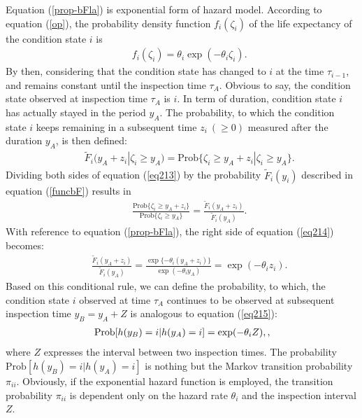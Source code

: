 Equation (\ref{prop-bFla}) is exponential form of hazard model. According to equation (\ref{op}), the probability density function $f_i(\zeta_i)$ of the life expectancy of the condition state $i$ is
\begin{eqnarray}
&& f_i(\zeta_i)=\theta_i \exp(-\theta_i \zeta_i).\label{kikan}
\end{eqnarray}
By then, considering that the condition state has changed to $i$ at the time  $\tau_{i-1}$, and remains constant until the inspection time $\tau_A$. Obvious to say, the condition state observed at inspection time $\tau_A$ is $i$. In term of duration, condition state $i$ has actually stayed in the period $y_A$. The probability, to which the condition state $i$ keeps remaining in a subsequent time $z_i~(\geq 0)$ measured after the duration $y_A$, is then defined:
\begin{eqnarray}
&& \tilde{F}_i(y_A+z_i|\zeta_i \geq y_A) 
 = \mbox{Prob} \{\zeta_i \geq y_A+z_i | \zeta_i \geq y_A\}. \label{eq213}
\end{eqnarray}
Dividing both sides of equation (\ref{eq213}) by the probability $\tilde{F}_i(y_i)$ described in equation (\ref{funcbF}) results in
\begin{eqnarray}
&& \frac{\mbox{Prob} \{\zeta_i \geq y_A+z_i\}}{ \mbox{Prob}\{\zeta_i \geq y_A\}} = \frac{\tilde{F}_i(y_A+z_i)}{\tilde{F}_i(y_A)}. \label{eq214}
\end{eqnarray}
With reference to equation (\ref{prop-bFla}), the right side of equation (\ref{eq214}) becomes:
\begin{eqnarray}
&& \frac{\tilde{F}_i(y_A+z_i)}{\tilde{F}_i(y_A)}= \frac{\exp \{-\theta_i (y_A+z_i)\}}{\exp( - \theta_i y_A)} 
 =\exp (-\theta_i z_i). \label{eq215}
\end{eqnarray}
Based on this conditional rule, we can define the probability, to which, the condition state $i$ observed at time $\tau_A$ continues to be observed at subsequent inspection time $y_B=y_A+Z$ is analogous to equation (\ref{eq215}):
\begin{eqnarray}
&& \hspace{-3mm} \mbox{Prob}[h(y_B)=i|h(y_A)=i]=\exp(-\theta_i Z), \label{pro1},
\end{eqnarray}
where $Z$ expresses the interval between two inspection times. The probability $\mbox{Prob}[h(y_B)=i|h(y_A)=i]$ is nothing but the Markov transition probability $\pi_{ii} $. Obviously, if the exponential hazard function is employed, the transition probability $\pi_{ii} $ is dependent only on the hazard rate $\theta_i$ and the inspection interval $Z$.
